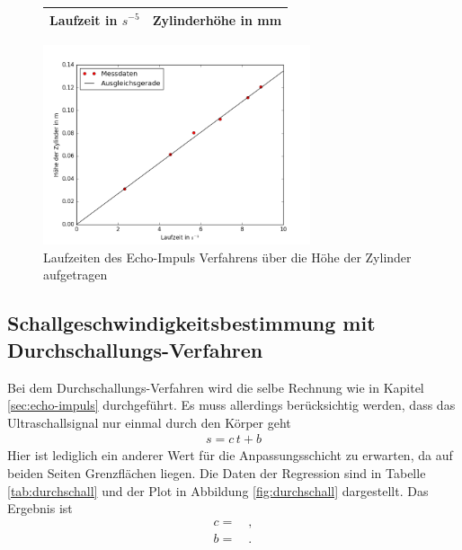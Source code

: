  \begin{figure}[h!]
 	\centering
 	\begin{tabular}{c|c}
 		Laufzeit in $s^{-5}$ & Zylinderhöhe in mm\\
 		\hline
 		
 	\end{tabular}
 	\label{tab:echo-impuls}
 \end{figure}
 
 \begin{figure}[h!]
 	\centering
 	\includegraphics[width=0.7\textwidth]{build/Impuls-Echo.png}
 	\caption{Laufzeiten des Echo-Impuls Verfahrens über die Höhe der Zylinder aufgetragen}
 	\label{fig:regression1}
 \end{figure}
 

 
 
 
 \clearpage
 \subsection{Schallgeschwindigkeitsbestimmung mit Durchschallungs-Verfahren}
 Bei dem Durchschallungs-Verfahren wird die selbe Rechnung wie in Kapitel \ref{sec:echo-impuls} durchgeführt. Es muss allerdings berücksichtig werden, dass das Ultraschallsignal nur einmal durch den Körper geht
 \begin{align}
 	s =  c \, t + b
 \end{align}
 Hier ist lediglich ein anderer Wert für die Anpassungsschicht zu erwarten, da auf beiden Seiten Grenzflächen liegen. Die Daten der Regression sind in Tabelle \ref{tab:durchschall} und der Plot in Abbildung \ref{fig:durchschall} dargestellt. Das Ergebnis ist
  \begin{align}
  	c =  \quad ,\\
  	b =  \quad .
  \end{align}
  
